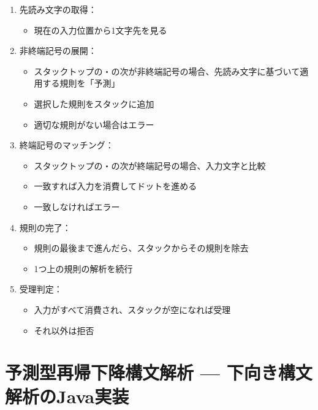 \begin{enumerate}
\item
  先読み文字の取得：

  \begin{itemize}
  \item
    現在の入力位置から1文字先を見る
  \end{itemize}
\item
  非終端記号の展開：

  \begin{itemize}
  \item
    スタックトップの・の次が非終端記号の場合、先読み文字に基づいて適用する規則を「予測」
  \item
    選択した規則をスタックに追加
  \item
    適切な規則がない場合はエラー
  \end{itemize}
\item
  終端記号のマッチング：

  \begin{itemize}
  \item
    スタックトップの・の次が終端記号の場合、入力文字と比較
  \item
    一致すれば入力を消費してドットを進める
  \item
    一致しなければエラー
  \end{itemize}
\item
  規則の完了：

  \begin{itemize}
  \item
    規則の最後まで進んだら、スタックからその規則を除去
  \item
    1つ上の規則の解析を続行
  \end{itemize}
\item
  受理判定：

  \begin{itemize}
  \item
    入力がすべて消費され、スタックが空になれば受理
  \item
    それ以外は拒否
  \end{itemize}
\end{enumerate}

\section{予測型再帰下降構文解析 --- 下向き構文解析のJava実装}

